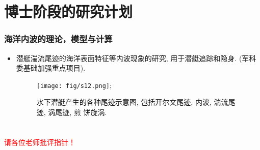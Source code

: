 \documentclass[UTF8]{ctexbeamer}	%
\theoremstyle{plain}
\theoremstyle{definition}
\theoremstyle{remark}
\numberwithin{equation}{section}
\begin{document}
\section{博士阶段的研究计划}
\begin{frame}
    \frametitle{海洋内波的理论，模型与计算}
    \begin{itemize}
        \item 潜艇湍流尾迹的海洋表面特征等内波现象的研究, 用于潜艇追踪和隐身.
        (军科委基础加强重点项目).
        \begin{figure}
            \texttt{[image: fig/s12.png]};
            \caption{水下潜艇产生的各种尾迹示意图, 包括开尔文尾迹, 内波, 湍流尾迹, 涡尾迹, 煎
            饼旋涡.}
        \end{figure}
    \end{itemize}
\end{frame}

\section*{}
\begin{frame}
    \centering\huge
    \textcolor{red}{请各位老师批评指针！}
\end{frame}
\end{document}
